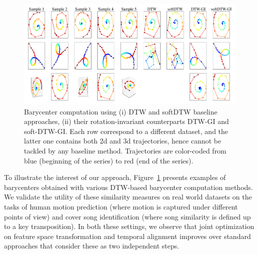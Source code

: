 \begin{figure}[t]
	\centering
	\includegraphics[width=\linewidth]{fig/barycenter_toys_allinone}
	\caption{
		Barycenter computation using (i) DTW and softDTW baseline approaches, (ii) their rotation-invariant counterparts DTW-GI and soft-DTW-GI.
		Each row correspond to a different dataset, and the latter one contains both 2d and 3d trajectories, hence cannot be tackled by any baseline method.
		Trajectories are color-coded from blue (beginning of the series) to red (end of the series).
		\label{fig:dtw_gi_bary}
	}
\end{figure}

To illustrate the interest of our approach,
Figure~\ref{fig:dtw_gi_bary} presents examples of barycenters obtained with
various DTW-based barycenter computation methods.
We validate the utility of these similarity measures on real world
datasets on the tasks of human motion prediction (where motion is captured under
different points of view) and cover song identification (where song similarity
is defined up to a key transposition).
In both these settings, we observe that joint optimization on feature space
transformation and temporal alignment improves over standard approaches that
consider these as two independent steps.
